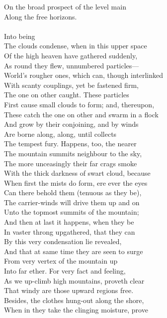 On the broad prospect of the level main\\
Along the free horizons.\\
\\
Into being\\
The clouds condense, when in this upper space\\
Of the high heaven have gathered suddenly,\\
As round they flew, unnumbered particles—\\
World's rougher ones, which can, though interlinked\\
With scanty couplings, yet be fastened firm,\\
The one on other caught. These particles\\
First cause small clouds to form; and, thereupon,\\
These catch the one on other and swarm in a flock\\
And grow by their conjoining, and by winds\\
Are borne along, along, until collects\\
The tempest fury. Happens, too, the nearer\\
The mountain summits neighbour to the sky,\\
The more unceasingly their far crags smoke\\
With the thick darkness of swart cloud, because\\
When first the mists do form, ere ever the eyes\\
Can there behold them (tenuous as they be),\\
The carrier-winds will drive them up and on\\
Unto the topmost summits of the mountain;\\
And then at last it happens, when they be\\
In vaster throng upgathered, that they can\\
By this very condensation lie revealed,\\
And that at same time they are seen to surge\\
From very vertex of the mountain up\\
Into far ether. For very fact and feeling,\\
As we up-climb high mountains, proveth clear\\
That windy are those upward regions free.\\
Besides, the clothes hung-out along the shore,\\
When in they take the clinging moisture, prove\\
